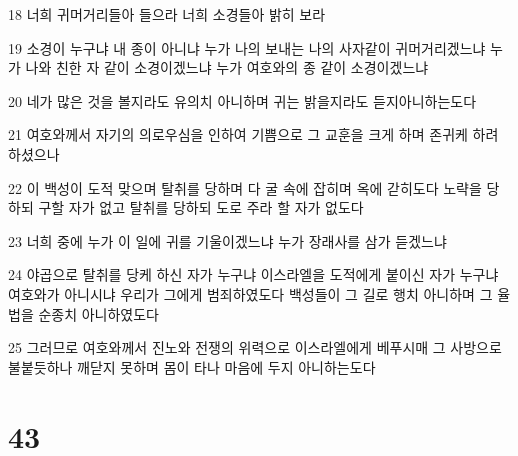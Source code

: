 \par 18 너희 귀머거리들아 들으라 너희 소경들아 밝히 보라
\par 19 소경이 누구냐 내 종이 아니냐 누가 나의 보내는 나의 사자같이 귀머거리겠느냐 누가 나와 친한 자 같이 소경이겠느냐 누가 여호와의 종 같이 소경이겠느냐
\par 20 네가 많은 것을 볼지라도 유의치 아니하며 귀는 밝을지라도 듣지아니하는도다
\par 21 여호와께서 자기의 의로우심을 인하여 기쁨으로 그 교훈을 크게 하며 존귀케 하려 하셨으나
\par 22 이 백성이 도적 맞으며 탈취를 당하며 다 굴 속에 잡히며 옥에 갇히도다 노략을 당하되 구할 자가 없고 탈취를 당하되 도로 주라 할 자가 없도다
\par 23 너희 중에 누가 이 일에 귀를 기울이겠느냐 누가 장래사를 삼가 듣겠느냐
\par 24 야곱으로 탈취를 당케 하신 자가 누구냐 이스라엘을 도적에게 붙이신 자가 누구냐 여호와가 아니시냐 우리가 그에게 범죄하였도다 백성들이 그 길로 행치 아니하며 그 율법을 순종치 아니하였도다
\par 25 그러므로 여호와께서 진노와 전쟁의 위력으로 이스라엘에게 베푸시매 그 사방으로 불붙듯하나 깨닫지 못하며 몸이 타나 마음에 두지 아니하는도다

\chapter{43}

